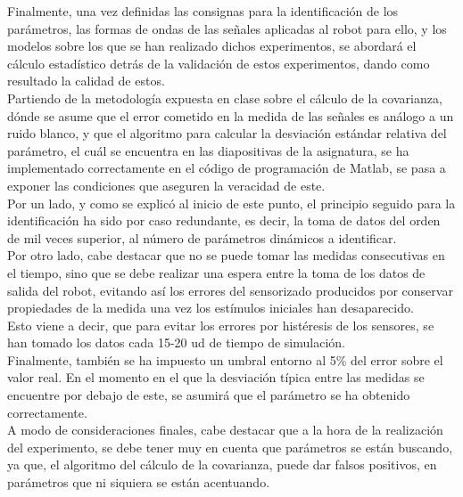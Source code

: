 Finalmente, una vez definidas las consignas para la identificación de los parámetros, las formas de ondas de las señales aplicadas al robot para ello, y los modelos sobre los que se han realizado dichos experimentos, se abordará el cálculo estadístico detrás de la validación de estos experimentos, dando como resultado la calidad de estos.\\


Partiendo de la metodología expuesta en clase sobre el cálculo de la covarianza, dónde se asume que el error cometido en la medida de las señales es análogo a un ruido blanco, y que el algoritmo para calcular la desviación estándar relativa del parámetro, el cuál se encuentra en las diapositivas de la asignatura, se ha implementado correctamente en el código de programación de Matlab, se pasa a exponer las condiciones que aseguren la veracidad de este. \\

Por un lado, y como se explicó al inicio de este punto, el principio seguido para la identificación ha sido por caso redundante, es decir, la toma de datos del orden de mil veces superior, al número de parámetros dinámicos a identificar.\\

Por otro lado, cabe destacar que no se puede tomar las medidas consecutivas en el tiempo, sino que se debe realizar una espera entre la toma de los datos de salida del robot, evitando así los errores del sensorizado producidos por conservar propiedades de la medida una vez los estímulos iniciales han desaparecido.\\

Esto viene a decir, que para evitar los errores por histéresis de los sensores, se han tomado los datos cada 15-20 ud de tiempo de simulación.\\

Finalmente, también se ha impuesto un umbral entorno al 5\% del error sobre el valor real. En el momento en el que la desviación típica entre las medidas se encuentre por debajo de este, se asumirá que el parámetro se ha obtenido correctamente.\\



A modo de consideraciones finales, cabe destacar que a la hora de la realización del experimento, se debe tener muy en cuenta que parámetros se están buscando, ya que,	el algoritmo del cálculo de la covarianza, puede dar falsos positivos, en parámetros que ni siquiera se están acentuando.\\



